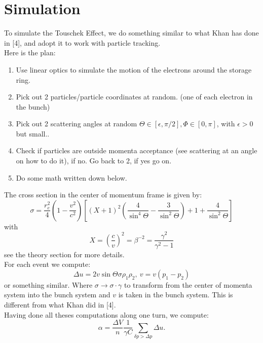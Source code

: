 \section{Simulation}
To simulate the Touschek Effect, we do something similar to what Khan has done in [4], and adopt it to work with particle tracking.\\
Here is the plan:
\begin{enumerate}
\item Use linear optics to simulate the motion of the electrons around the storage ring.
\item Pick out 2 particles/particle coordinates at random. (one of each electron in the bunch)
\item Pick out 2 scattering angles at random $\Theta \in \left[\epsilon,\pi/2\right], \Phi \in \left[0,\pi\right]$, with $\epsilon > 0$ but small..
\item Check if particles are outside momenta acceptance (see scattering at an angle on how to do it), if no. Go back to 2, if yes go on.
\item Do some math written down below.
\end{enumerate}
The cross section in the center of momentum frame is given by:
\begin{equation} \sigma = \frac{r_e ^2}{4} \left(1 - \frac{v^2}{c^2}\right) \left[ (X+1)^2 \left(\frac 4 {\sin^4 \Theta} - \frac 3 {\sin^2 \Theta}\right) + 1 + \frac 4 {\sin^2 \Theta}\right] \end{equation}
with
\begin{equation} X = \left(\frac c v\right)^2 = \beta^{-2} = \frac{\gamma^2}{\gamma^2 - 1} \end{equation}
see the theory section for more details.\\
For each event we compute:
\begin{equation} \Delta u = 2 v \sin \Theta \sigma \rho_1 \rho_2, \ v = v(p_1 - p_2) \end{equation}
or something similar. Where $\sigma \rightarrow \sigma \cdot \gamma$ to transform from the center of momenta system into the bunch system and $v$ is taken in the bunch system. This is different from what Khan did in [4].\\
Having done all theses computations along one turn, we compute:
\begin{equation} \alpha = \frac{\Delta V} n \frac {1}{\gamma C} \sum\limits_{\delta p > \Delta p} \Delta u. \end{equation}
